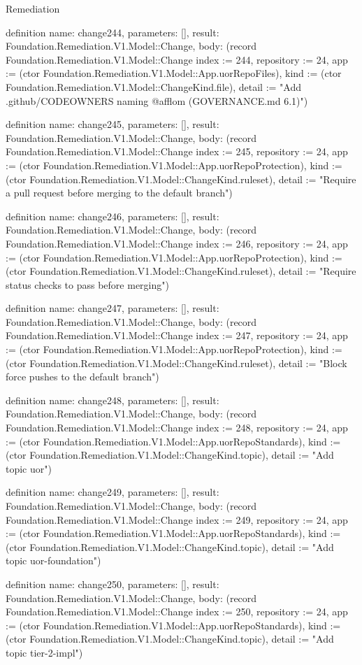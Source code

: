 \begin{lexlean}{Remediation}
\begin{semanticmodule}
definition{
  name: change244,
  parameters: [],
  result: Foundation.Remediation.V1.Model::Change,
  body: (record Foundation.Remediation.V1.Model::Change {index := 244, repository := 24, app := (ctor Foundation.Remediation.V1.Model::App.uorRepoFiles), kind := (ctor Foundation.Remediation.V1.Model::ChangeKind.file), detail := "Add .github/CODEOWNERS naming @afflom (GOVERNANCE.md 6.1)"})
}

definition{
  name: change245,
  parameters: [],
  result: Foundation.Remediation.V1.Model::Change,
  body: (record Foundation.Remediation.V1.Model::Change {index := 245, repository := 24, app := (ctor Foundation.Remediation.V1.Model::App.uorRepoProtection), kind := (ctor Foundation.Remediation.V1.Model::ChangeKind.ruleset), detail := "Require a pull request before merging to the default branch"})
}

definition{
  name: change246,
  parameters: [],
  result: Foundation.Remediation.V1.Model::Change,
  body: (record Foundation.Remediation.V1.Model::Change {index := 246, repository := 24, app := (ctor Foundation.Remediation.V1.Model::App.uorRepoProtection), kind := (ctor Foundation.Remediation.V1.Model::ChangeKind.ruleset), detail := "Require status checks to pass before merging"})
}

definition{
  name: change247,
  parameters: [],
  result: Foundation.Remediation.V1.Model::Change,
  body: (record Foundation.Remediation.V1.Model::Change {index := 247, repository := 24, app := (ctor Foundation.Remediation.V1.Model::App.uorRepoProtection), kind := (ctor Foundation.Remediation.V1.Model::ChangeKind.ruleset), detail := "Block force pushes to the default branch"})
}

definition{
  name: change248,
  parameters: [],
  result: Foundation.Remediation.V1.Model::Change,
  body: (record Foundation.Remediation.V1.Model::Change {index := 248, repository := 24, app := (ctor Foundation.Remediation.V1.Model::App.uorRepoStandards), kind := (ctor Foundation.Remediation.V1.Model::ChangeKind.topic), detail := "Add topic uor"})
}

definition{
  name: change249,
  parameters: [],
  result: Foundation.Remediation.V1.Model::Change,
  body: (record Foundation.Remediation.V1.Model::Change {index := 249, repository := 24, app := (ctor Foundation.Remediation.V1.Model::App.uorRepoStandards), kind := (ctor Foundation.Remediation.V1.Model::ChangeKind.topic), detail := "Add topic uor-foundation"})
}

definition{
  name: change250,
  parameters: [],
  result: Foundation.Remediation.V1.Model::Change,
  body: (record Foundation.Remediation.V1.Model::Change {index := 250, repository := 24, app := (ctor Foundation.Remediation.V1.Model::App.uorRepoStandards), kind := (ctor Foundation.Remediation.V1.Model::ChangeKind.topic), detail := "Add topic tier-2-impl"})
}


\end{semanticmodule}
\end{lexlean}
